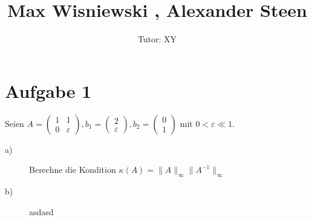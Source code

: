 \documentclass[11pt,a4paper,ngerman]{article}
\author{Tutor: XY}
\date{}
\title{Max Wisniewski , Alexander Steen}
\begin{document}

\maketitle
\thispagestyle{fancy}



\section*{Aufgabe 1}

Seien $A = \left(
                \begin{array}{cc}
                    1 & 1 \\
                    0 & \varepsilon
                \end{array}
           \right),
      b_1 = \left(
                \begin{array}{c}
                    2 \\
                    \varepsilon
                \end{array}
           \right),
      b_2 = \left(
                \begin{array}{c}
                    0 \\
                    1 
                \end{array}
           \right)$
mit $0 < \varepsilon \ll 1$.

\begin{description}
\item[a)] Berechne die Kondition $\kappa(A) = \|A \|_{\infty} \|A^{-1} \|_{\infty} $
\item[b)] asdasd
\end{description}


\label{LastPage}
\end{document}
